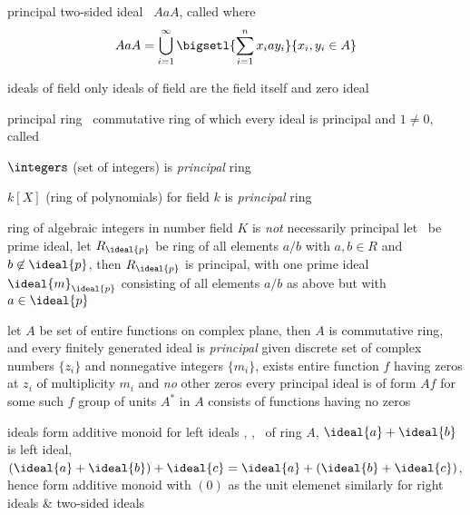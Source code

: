 \documentclass[17pt,landscape]{foils}
\begin{document}
{\begin{mydefinition}{principal two-sided ideal}%
		\
	$AaA$, called 
	where
	$$
		AaA
		=
		\bigcup_{i=1}^\infty \bigsetl{\sum_{i=1}^n x_i a y_i}{x_i,y_i\in A}
	$$
\end{mydefinition}

\begin{mylemma}{ideals of field}
only ideals of field
are the field itself and zero ideal
\end{mylemma}



\begin{mydefinition}{principal ring}%
		\
	commutative ring of which every ideal is principal and $1\neq0$,
	called 
\end{mydefinition}

\bit
\vitem
	$\integers$ (set of integers)
	is \emph{principal} ring

\vitem
	$k[X]$ (ring of polynomials) for field $k$
	is \emph{principal} ring

\vitem
	ring of algebraic integers in number field $K$
	is \emph{not} necessarily principal
	\bit
	\vitem
		let \ be prime ideal,
		let $R_\ideal{p}$
		be ring of all elements $a/b$
		with $a,b\in R$ and $b\not\in\ideal{p}$,
		then
		$R_\ideal{p}$ is principal,
		with one prime ideal $\ideal{m}_\ideal{p}$
		consisting of all elements $a/b$ as above
		but with $a\in\ideal{p}$
	\eit

\vitem
	let $A$
	be set of entire functions on complex plane,
	then $A$ is commutative ring,
	and every finitely generated ideal is \emph{principal}
	\bit
	\vitem
		given discrete set of complex numbers $\{z_i\}$
		and nonnegative integers $\{m_i\}$,
		exists entire function $f$
		having zeros at $z_i$ of multiplicity $m_i$
		and \emph{no} other zeros
	\vitem
		every principal ideal is of form $Af$ for some such $f$
	\vitem
		group of units $A^\ast$ in $A$
		consists of functions having no zeros
	\eit

\eit



\bit
\item
	ideals form additive monoid
	\bit
	\vitem
		for left ideals , , \ of ring $A$,
		$\ideal{a}+\ideal{b}$ is left ideal,
		$(\ideal{a}+\ideal{b})+\ideal{c} =\ideal{a}+(\ideal{b}+\ideal{c})$,
		hence form additive monoid with $(0)$ as the unit elemenet
	\vitem
		similarly
		for right ideals \& two-sided ideals
	\eit

}
\end{document}
